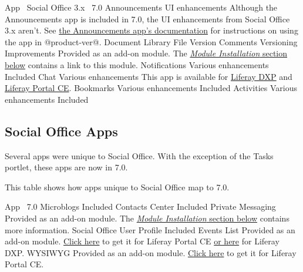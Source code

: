 App \textbar{} ~Social Office 3.x \textbar{} ~7.0 \textbar{}
Announcements \textbar{} UI enhancements \textbar{} Although the
Announcements app is included in 7.0, the UI enhancements from Social
Office 3.x aren't. See
\href{/docs/7-0/user/-/knowledge_base/u/sending-alerts-and-announcements}{the
Announcements app's documentation} for instructions on using the app in
@product-ver@. \textbar{} Document Library File Version Comments
\textbar{} Versioning Improvements \textbar{} Provided as an add-on
module. The
\href{/docs/7-0/deploy/-/knowledge_base/d/upgrading-social-office\#module-installation}{\emph{Module
Installation} section below} contains a link to this module. \textbar{}
Notifications \textbar{} Various enhancements \textbar{} Included
\textbar{} Chat \textbar{} Various enhancements \textbar{} This app is
available for
\href{https://web.liferay.com/marketplace/-/mp/application/15184463}{Liferay
DXP} and
\href{https://web.liferay.com/marketplace/-/mp/application/15392476}{Liferay
Portal CE}. \textbar{} Bookmarks \textbar{} Various enhancements
\textbar{} Included \textbar{} Activities \textbar{} Various
enhancements \textbar{} Included \textbar{}

\subsection{Social Office Apps}\label{social-office-apps}

Several apps were unique to Social Office. With the exception of the
Tasks portlet, these apps are now in 7.0.

This table shows how apps unique to Social Office map to 7.0.

App \textbar{} ~7.0 \textbar{} Microblogs \textbar{} Included \textbar{}
Contacts Center \textbar{} Included \textbar{} Private Messaging
\textbar{} Provided as an add-on module. The
\href{/docs/7-0/deploy/-/knowledge_base/d/upgrading-social-office\#module-installation}{\emph{Module
Installation} section below} contains more information. \textbar{}
Social Office User Profile \textbar{} Included \textbar{} Events List
\textbar{} Provided as an add-on module.
\href{https://web.liferay.com/marketplace/-/mp/application/83511066}{Click
here} to get it for Liferay Portal CE
\href{https://web.liferay.com/marketplace/-/mp/application/83511153}{or
here} for Liferay DXP. \textbar{} WYSIWYG \textbar{} Provided as an
add-on module.
\href{https://web.liferay.com/marketplace/-/mp/application/15502123}{Click
here} to get it for Liferay Portal CE. \textbar{}

